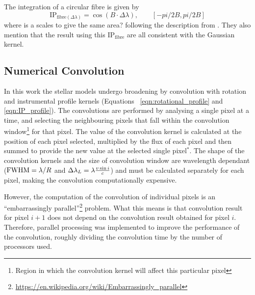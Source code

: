 The integration of a circular fibre is given by
\begin{equation}
\textrm{IP}_{\textrm{fibre}(\Delta\lambda)} = \cos(B\cdot\Delta\lambda) ,  \hspace{2em} [-pi/2B, pi/2B]
\end{equation}
where is a scales to give the same area? 
following the description from \citet{artigau_optical_2018}.  They also mention that the result using this $\textrm{IP}_{\textrm{fibre}}$ are all consistent with the Gaussian kernel.

\subsection{Numerical Convolution}
\label{subsec:numerical_convolution}
In this work the stellar models undergo broadening by convolution with rotation and instrumental profile kernels (Equations ~\ref{eqn:rotational_profile} and \ref{eqn:IP_profile}).
The convolutions are performed by analysing a single pixel at a time, and selecting the neighbouring pixels that fall within the convolution window\footnote{Region in which the convolution kernel will affect this particular pixel} for that pixel.
The value of the convolution kernel is calculated at the position of each pixel selected, multiplied by the flux of each pixel and then summed to provide the new value at the selected single pixel{$^\textbf{*}$}.
 The shape of the convolution kernels and the size of convolution window are wavelength dependant (${\textrm{FWHM}}=\lambda / R$ and $\Delta\lambda_{L}=\lambda \frac{v\sin{i}}{c}$) and must be calculated separately for each pixel, making the convolution computationally expensive.

 However, the computation of the convolution of individual pixels is an ``embarrassingly parallel''\footnote{\href{https://en.wikipedia.org/wiki/Embarrassingly\_parallel}{https://en.wikipedia.org/wiki/Embarrassingly\_parallel}} problem.
 What this means is that convolution result for pixel $i+1$ does not depend on the convolution result obtained for pixel $i$.
 Therefore, parallel processing was implemented to improve the performance of the convolution, roughly dividing the convolution time by the number of processors used.

